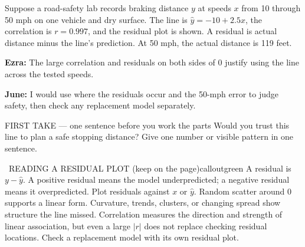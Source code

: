 \documentclass[11pt]{article}
\begin{document}


Suppose a road-safety lab records braking distance $y$ at speeds $x$ from 10 through 50 mph on one vehicle and dry surface. The line is $\hat y=-10+2.5x$, the correlation is $r=0.997$, and the residual plot is shown. A residual is actual distance minus the line's prediction. At 50 mph, the actual distance is 119 feet.\par\smallskip \textbf{Ezra:} The large correlation and residuals on both sides of 0 justify using the line across the tested speeds.\par \textbf{June:} I would use where the residuals occur and the 50-mph error to judge safety, then check any replacement model separately.\par
\begin{center}
\end{center}
\begin{firsttakebox}{FIRST TAKE --- one sentence before you work the parts}
Would you trust this line to plan a safe stopping distance? Give one number or visible pattern in one sentence.
\workspace{0.85in}
\end{firsttakebox}

\begin{callout}{\IconBook\ READING A RESIDUAL PLOT (keep on the page)}{calloutgreen}
A residual is $y-\hat y$. A positive residual means the model underpredicted;
a negative residual means it overpredicted. Plot residuals against $x$ or $\hat y$.
Random scatter around 0 supports a linear form. Curvature, trends, clusters, or
changing spread show structure the line missed. Correlation measures the direction
and strength of linear association, but even a large $|r|$ does not replace checking
residual locations. Check a replacement model with its own residual plot.
\end{callout}
\end{document}
